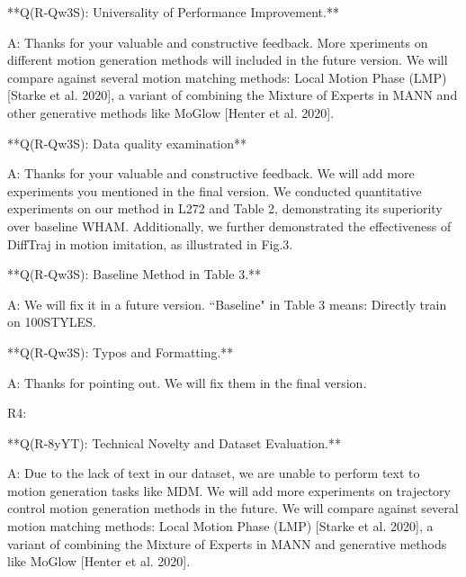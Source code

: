 \documentclass{article}
\begin{document}
\begin{markdown}
**Q(R-Qw3S): Universality of Performance Improvement.**

A: Thanks for your valuable and constructive feedback. More xperiments on different motion generation methods will included in the future version. We will compare against several motion matching methods: Local Motion Phase (LMP) [Starke et al. 2020], a variant of combining the Mixture of Experts in MANN and other generative methods like MoGlow [Henter et al. 2020].


**Q(R-Qw3S): Data quality examination**

A: Thanks for your valuable and constructive feedback. We will add more experiments you mentioned in the final version. We conducted quantitative experiments on our method in L272 and Table 2, demonstrating its superiority over baseline WHAM. Additionally, we further demonstrated the effectiveness of DiffTraj in motion imitation, as illustrated in Fig.3. 



**Q(R-Qw3S): Baseline Method in Table 3.**

A: We will fix it in a future version. ``Baseline" in Table 3 means: Directly train on 100STYLES.


**Q(R-Qw3S): Typos and Formatting.**

A: Thanks for pointing out. We will fix them in the final version.



R4:

**Q(R-8yYT): Technical Novelty and Dataset Evaluation.**

A: Due to the lack of text in our dataset, we are unable to perform text to motion generation tasks like MDM. We will add more experiments on trajectory control motion generation methods in the future. We will compare against several motion matching methods: Local Motion Phase (LMP) [Starke et al. 2020], a variant of combining the Mixture of Experts in MANN and generative methods like MoGlow [Henter et al. 2020].


\end{markdown}
\end{document}
